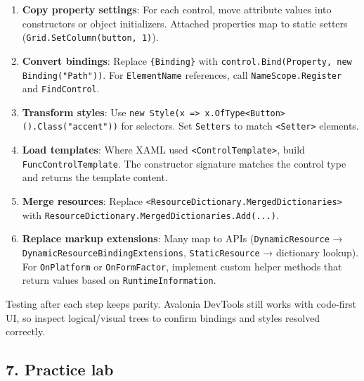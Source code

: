 \begin{enumerate}
\def\labelenumi{\arabic{enumi}.}
\tightlist
\item
  \textbf{Copy property settings}: For each control, move attribute
  values into constructors or object initializers. Attached properties
  map to static setters
  (\passthrough{\lstinline!Grid.SetColumn(button, 1)!}).
\item
  \textbf{Convert bindings}: Replace
  \passthrough{\lstinline!\{Binding\}!} with
  \passthrough{\lstinline!control.Bind(Property, new Binding("Path"))!}.
  For \passthrough{\lstinline!ElementName!} references, call
  \passthrough{\lstinline!NameScope.Register!} and
  \passthrough{\lstinline!FindControl!}.
\item
  \textbf{Transform styles}: Use
  \passthrough{\lstinline!new Style(x => x.OfType<Button>().Class("accent"))!}
  for selectors. Set \passthrough{\lstinline!Setters!} to match
  \passthrough{\lstinline!<Setter>!} elements.
\item
  \textbf{Load templates}: Where XAML used
  \passthrough{\lstinline!<ControlTemplate>!}, build
  \passthrough{\lstinline!FuncControlTemplate!}. The constructor
  signature matches the control type and returns the template content.
\item
  \textbf{Merge resources}: Replace
  \passthrough{\lstinline!<ResourceDictionary.MergedDictionaries>!} with
  \passthrough{\lstinline!ResourceDictionary.MergedDictionaries.Add(...)!}.
\item
  \textbf{Replace markup extensions}: Many map to APIs
  (\passthrough{\lstinline!DynamicResource!} →
  \passthrough{\lstinline!DynamicResourceBindingExtensions!},
  \passthrough{\lstinline!StaticResource!} → dictionary lookup). For
  \passthrough{\lstinline!OnPlatform!} or
  \passthrough{\lstinline!OnFormFactor!}, implement custom helper
  methods that return values based on
  \passthrough{\lstinline!RuntimeInformation!}.
\end{enumerate}

Testing after each step keeps parity. Avalonia DevTools still works with
code-first UI, so inspect logical/visual trees to confirm bindings and
styles resolved correctly.

\subsection{7. Practice lab}\label{practice-lab}

